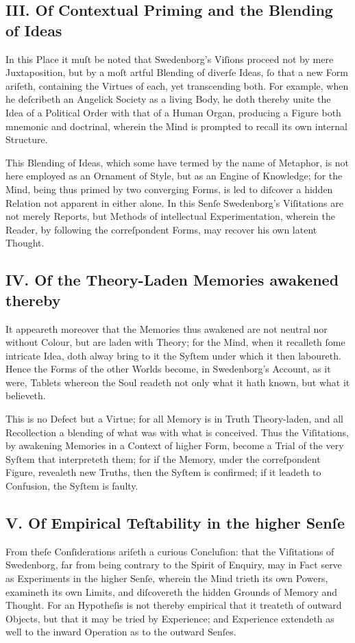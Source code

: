 \documentclass[12pt]{article}
\begin{document}
\subsection*{III. Of Contextual Priming and the Blending of Ideas}
In this Place it muſt be noted that Swedenborg’s Viſions proceed not by 
mere Juxtaposition, but by a moſt artful Blending of diverſe Ideas, 
ſo that a new Form ariſeth, containing the Virtues of each, yet 
transcending both. For example, when he deſcribeth an Angelick 
Society as a living Body, he doth thereby unite the Idea of a 
Political Order with that of a Human Organ, producing a Figure 
both mnemonic and doctrinal, wherein the Mind is prompted to recall 
its own internal Structure.

This Blending of Ideas, which some have termed by the name of 
Metaphor, is not here employed as an Ornament of Style, but as an 
Engine of Knowledge; for the Mind, being thus primed by two 
converging Forms, is led to diſcover a hidden Relation not apparent 
in either alone. In this Senſe Swedenborg’s Viſitations are not 
merely Reports, but Methods of intellectual Experimentation, wherein 
the Reader, by following the correſpondent Forms, may recover his own 
latent Thought.

\subsection*{IV. Of the Theory-Laden Memories awakened thereby}
It appeareth moreover that the Memories thus awakened are not neutral 
nor without Colour, but are laden with Theory; for the Mind, when it 
recalleth ſome intricate Idea, doth alway bring to it the Syſtem 
under which it then laboureth. Hence the Forms of the other Worlds 
become, in Swedenborg’s Account, as it were, Tablets whereon the 
Soul readeth not only what it hath known, but what it believeth.

This is no Defect but a Virtue; for all Memory is in Truth 
Theory-laden, and all Recollection a blending of what was with 
what is conceived. Thus the Viſitations, by awakening Memories in 
a Context of higher Form, become a Trial of the very Syſtem that 
interpreteth them; for if the Memory, under the correſpondent 
Figure, revealeth new Truths, then the Syſtem is confirmed; if it 
leadeth to Confusion, the Syſtem is faulty.

\subsection*{V. Of Empirical Teſtability in the higher Senſe}
From theſe Conſiderations ariſeth a curious Concluſion: that the 
Viſitations of Swedenborg, far from being contrary to the Spirit of 
Enquiry, may in Fact serve as Experiments in the higher Senſe, 
wherein the Mind trieth its own Powers, examineth its own Limits, 
and diſcovereth the hidden Grounds of Memory and Thought. For an 
Hypotheſis is not thereby empirical that it treateth of outward 
Objects, but that it may be tried by Experience; and Experience 
extendeth as well to the inward Operation as to the outward Senſes.
\end{document}
